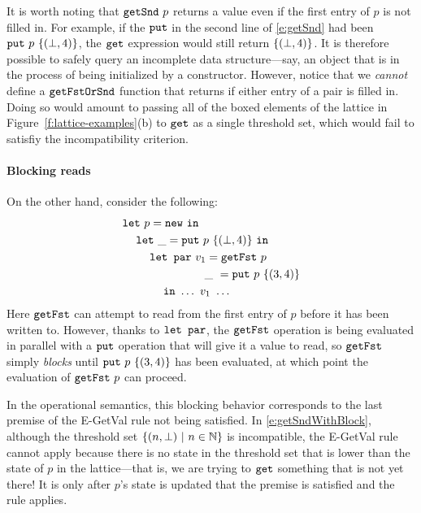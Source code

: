 It is worth noting that $\mbox{\texttt{getSnd}}~p$ returns a value even if the
first entry of $p$ is not filled in.  For example, if the $\mbox{\texttt{put}}$ in
the second line of \eqref{e:getSnd} had been
$\mbox{\texttt{put}}~p~\lbrace (\bot,4) \rbrace$, the $\mbox{\texttt{get}}$ expression would still
return $\lbrace (\bot,4) \rbrace$.  It is therefore possible to safely
query an incomplete data structure---say, an object that is in the
process of being initialized by a constructor.  However, notice that
we \emph{cannot} define a $\mbox{\texttt{getFstOrSnd}}$ function that returns if
either entry of a pair is filled in.  Doing so would amount to passing
all of the boxed elements of the lattice in
Figure~\ref{f:lattice-examples}(b) to $\mbox{\texttt{get}}$ as a single threshold
set, which would fail to satisfiy the incompatibility criterion.

\paragraph{Blocking reads}

On the other hand, consider the following:
\begin{equation}
\begin{split}
& \letexp{p}{\NEW}{ \\
& \letspace \letexp{\_}{\putexp{p}{\stateset{(\bot,4)}}}{ \\
& \letspace \letspace \LETPAR ~v_1 = \getfstexp{p} \\
& \letspace \letspace \letparspace \hspace{0.62em}\_~= \putexp{p}{\stateset{(3,4)}} \\
& \letspace \letspace \letspace \IN~ \dots~v_1~\dots }}
\end{split}
\label{e:getSndWithBlock}
\end{equation}
Here $\mbox{\texttt{getFst}}$ can attempt to read from the first entry of $p$ before
it has been written to.  However, thanks to $\mbox{\texttt{\mbox{\texttt{let}}~\mbox{\texttt{par}}}}$, the $\mbox{\texttt{getFst}}$
operation is being evaluated in parallel with a $\mbox{\texttt{put}}$ operation that
will give it a value to read, so $\mbox{\texttt{getFst}}$ simply \emph{blocks} until
$\mbox{\texttt{put}}~p~\lbrace (3,4) \rbrace$ has been evaluated, at which point the
evaluation of $\mbox{\texttt{getFst}}~p$ can proceed.

In the operational semantics, this blocking behavior corresponds to
the last premise of the {\sc E-GetVal} rule not being satisfied.  In
\eqref{e:getSndWithBlock}, although the threshold set $\lbrace (n,
  \bot) \ | \  n \in \mathbb{N} \rbrace$ is incompatible, the {\sc E-GetVal}
rule cannot apply because there is no state in the threshold set that
is lower than the state of $p$ in the lattice---that is, we are trying
to $\mbox{\texttt{get}}$ something that is not yet there!  It is only after $p$'s
state is updated that the premise is satisfied and the rule applies.
